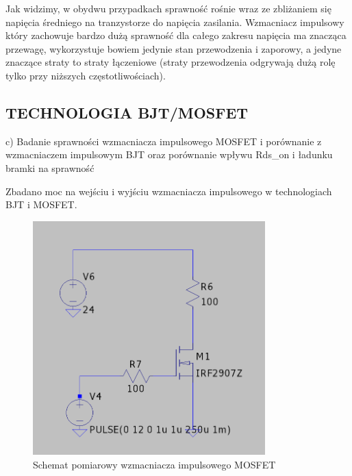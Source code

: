 \documentclass[11pt]{article}
\begin{document}
Jak widzimy, w obydwu przypadkach sprawność rośnie wraz ze zbliżaniem się napięcia średniego na tranzystorze do napięcia zasilania. Wzmacniacz impulsowy który zachowuje bardzo dużą sprawność dla całego zakresu napięcia ma znacząca przewagę,
wykorzystuje bowiem jedynie stan przewodzenia i zaporowy, a jedyne znaczące straty to straty łączeniowe
(straty przewodzenia odgrywają dużą rolę tylko przy niższych częstotliwościach).\\

\subsection{TECHNOLOGIA BJT/MOSFET}

c) Badanie sprawności wzmacniacza impulsowego MOSFET i porównanie z wzmacniaczem impulsowym BJT oraz porównanie wpływu Rds_on i ładunku bramki na sprawność

Zbadano moc na wejściu i wyjściu wzmacniacza impulsowego w technologiach BJT i MOSFET.\\

\begin{figure}[H]
\centering
\includegraphics[width=0.8\textwidth]{aun1_impulsowy_mosfet.png}
\caption{Schemat pomiarowy wzmacniacza impulsowego MOSFET}
\end{figure}
\end{document}

